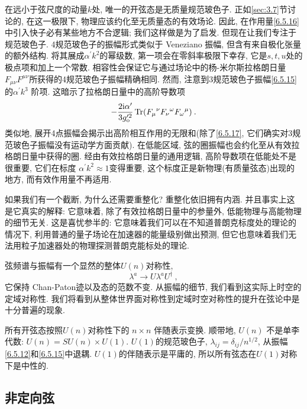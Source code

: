 在远小于弦尺度的动量$k$处, 唯一的开弦态是无质量规范玻色子. 正如\ref{sec:3.7}节讨论的, 在这一极限下, 物理应该约化至无质量态的有效场论. 
因此, 在作用量\eqref{6.5.16}中引入快子必有某些地方不合逻辑; 我们这样做是为了启发. 但现在让我们专注于规范玻色子. 
4规范玻色子的振幅形式类似于 Veneziano 振幅, 但含有来自极化张量的额外结构. 将其展成$\alpha^{\prime} k^{2}$的幂级数, 第一项会在零斜率极限下幸存, 
它是$s, t, u$处的极点项和加上一个常数. 相容性会保证它与通过场论中的杨-米尔斯拉格朗日量$F_{\mu \nu} F^{\mu\nu} $所获得的4规范玻色子振幅精确相同. 
然而, 注意到3规范玻色子振幅\eqref{6.5.15}的$\alpha^{\prime} k^{3}$ 阶项. 这暗示了拉格朗日量中的高阶导数项
\begin{equation}
	-\frac{2 \mathrm{i} \alpha^{\prime}}{3 g_{\text{o}}^{\prime 2}} \operatorname{Tr}(F_{\mu}{}^{\nu} F_{\nu}{}^{\omega} F_{\omega}{}^{\mu}) \:.
	\label{6.5.17}
\end{equation}
类似地, 展开4点振幅会揭示出高阶相互作用的无限和(除了\eqref{6.5.17}, 它们确实对3规范玻色子振幅没有运动学方面贡献). 
在低能区域, 弦的圈振幅也会约化至从有效拉格朗日量中获得的圈.  经由有效拉格朗日量的通用逻辑, 高阶导数项在低能处不是很重要, 
它们在标度 $\alpha^{\prime} k^{2} \approx 1$变得重要, 这个标度正是新物理(有质量弦态)出现的地方, 而有效作用量不再适用.

如果我们有一个截断, 为什么还需要重整化? 重整化依旧拥有内涵. 并且事实上这是它真实的解释: 它意味着, 除了有效拉格朗日量中的参量外, 低能物理与高能物理的细节无关. 
这是喜忧参半的: 它意味着我们可以在不知道普朗克标度处的理论的情况下, 利用普通的量子场论在加速器的能量级别做出预测, 
但它也意味着我们无法用粒子加速器处的物理探测普朗克能标处的理论.

弦频谱与振幅有一个显然的整体$U(n)$对称性,
\begin{equation}
	\lambda^{a} \rightarrow U \lambda^{a} U^{\dagger} \:, \label{6.5.18}
\end{equation}
它保持 Chan-Paton迹以及态的范数不变. 从振幅的细节, 我们看到这实际上时空的定域对称性. 我们将看到从整体世界面对称性到定域时空对称性的提升在弦论中是十分普遍的现象.

所有开弦态按照$U(n)$对称性下的 $n \times n$ 伴随表示变换. 顺带地, $U(n)$ 不是单李代数: $U(n)=S U(n) \times U(1) $. 
$U(1)$的规范玻色子, $\lambda_{i j}=\delta_{i j} / n^{1 / 2}$, 从振幅\eqref{6.5.12}和\eqref{6.5.15}中退耦. 
$U(1)$的伴随表示是平庸的, 所以所有弦态在$U(1)$对称下是中性的.

\subsection*{非定向弦}

